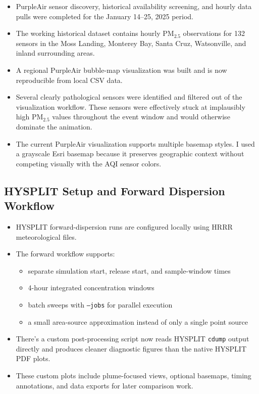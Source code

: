 \documentclass[11pt]{article}
\begin{document}
\begin{itemize}
\item PurpleAir sensor discovery, historical availability screening, and hourly data pulls were completed for the January 14--25, 2025 period.
\item The working historical dataset contains hourly PM$_{2.5}$ observations for 132 sensors in the Moss Landing, Monterey Bay, Santa Cruz, Watsonville, and inland surrounding areas.
\item A regional PurpleAir bubble-map visualization was built and is now reproducible from local CSV data.
\item Several clearly pathological sensors were identified and filtered out of the visualization workflow. These sensors were effectively stuck at implausibly high PM$_{2.5}$ values throughout the event window and would otherwise dominate the animation.
\item The current PurpleAir visualization supports multiple basemap styles. I used a grayscale Esri basemap because it preserves geographic context without competing visually with the AQI sensor colors.
\end{itemize}

\subsection*{HYSPLIT Setup and Forward Dispersion Workflow}

\begin{itemize}
\item HYSPLIT forward-dispersion runs are configured locally using HRRR meteorological files.
\item The forward workflow supports:
\begin{itemize}
\item separate simulation start, release start, and sample-window times
\item 4-hour integrated concentration windows
\item batch sweeps with \texttt{--jobs} for parallel execution
\item a small area-source approximation instead of only a single point source
\end{itemize}
\item There's a custom post-processing script now reads HYSPLIT \texttt{cdump} output directly and produces cleaner diagnostic figures than the native HYSPLIT PDF plots.
\item These custom plots include plume-focused views, optional basemaps, timing annotations, and data exports for later comparison work.
\end{itemize}
\end{document}
